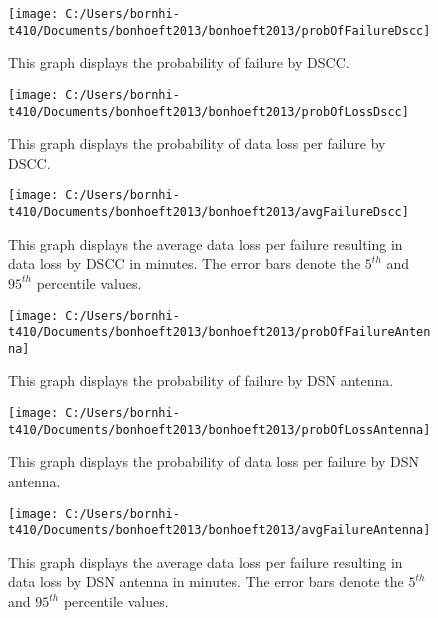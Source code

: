 \documentclass[aps,twocolumn,nobalancelastpage,amsmath,amssymb,
nofootinbib,superscriptaddress, ]{revtex4}
\begin{document}
\begin{figure}[h]
\texttt{[image: C:/Users/bornhi-t410/Documents/bonhoeft2013/bonhoeft2013/probOfFailureDscc]}
\caption{This graph displays the probability of failure by DSCC.\label{fig:fig8}}
\end{figure}

\begin{figure}[h]
\texttt{[image: C:/Users/bornhi-t410/Documents/bonhoeft2013/bonhoeft2013/probOfLossDscc]}
\caption{This graph displays the probability of data loss per failure by DSCC. \label{fig:fig9}}
\end{figure}

\begin{figure}[h]
\texttt{[image: C:/Users/bornhi-t410/Documents/bonhoeft2013/bonhoeft2013/avgFailureDscc]}
\caption{This graph displays the average data loss per failure resulting in data loss by DSCC in minutes. The error bars denote the $5^{th}$ and $95^{th}$ percentile values. \label{fig:fig10}}
\end{figure}

\begin{figure}[h]
\texttt{[image: C:/Users/bornhi-t410/Documents/bonhoeft2013/bonhoeft2013/probOfFailureAntenna]}
\caption{This graph displays the probability of failure by DSN antenna.\label{fig:fig11}}
\end{figure}

\begin{figure}[h]
\texttt{[image: C:/Users/bornhi-t410/Documents/bonhoeft2013/bonhoeft2013/probOfLossAntenna]}
\caption{This graph displays the probability of data loss per failure by DSN antenna. \label{fig:fig12}}
\end{figure}

\begin{figure}[h]
\texttt{[image: C:/Users/bornhi-t410/Documents/bonhoeft2013/bonhoeft2013/avgFailureAntenna]}
\caption{This graph displays the average data loss per failure resulting in data loss by DSN antenna in minutes. The error bars denote the $5^{th}$ and $95^{th}$ percentile values. \label{fig:fig13}}
\end{figure}
\end{document}
